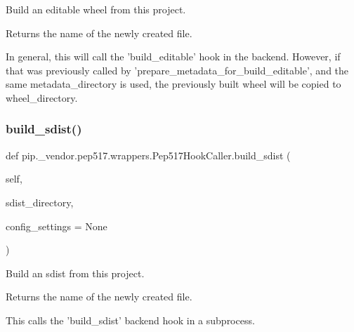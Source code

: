 \begin{DoxyVerb}Build an editable wheel from this project.

Returns the name of the newly created file.

In general, this will call the 'build_editable' hook in the backend.
However, if that was previously called by
'prepare_metadata_for_build_editable', and the same metadata_directory
is used, the previously built wheel will be copied to wheel_directory.
\end{DoxyVerb}
 \mbox{\label{classpip_1_1__vendor_1_1pep517_1_1wrappers_1_1Pep517HookCaller_a487eb1b2488381ed3608d938621cee31}} 
\subsubsection{\texorpdfstring{build\+\_\+sdist()}{build\_sdist()}}
{\footnotesize\ttfamily def pip.\+\_\+vendor.\+pep517.\+wrappers.\+Pep517\+Hook\+Caller.\+build\+\_\+sdist (\begin{DoxyParamCaption}\item[{}]{self,  }\item[{}]{sdist\+\_\+directory,  }\item[{}]{config\+\_\+settings = {\ttfamily None} }\end{DoxyParamCaption})}

\begin{DoxyVerb}Build an sdist from this project.

Returns the name of the newly created file.

This calls the 'build_sdist' backend hook in a subprocess.
\end{DoxyVerb}
 \mbox{\label{classpip_1_1__vendor_1_1pep517_1_1wrappers_1_1Pep517HookCaller_ac358ca6492dc774ff3e1abd11fcc2215}} 

